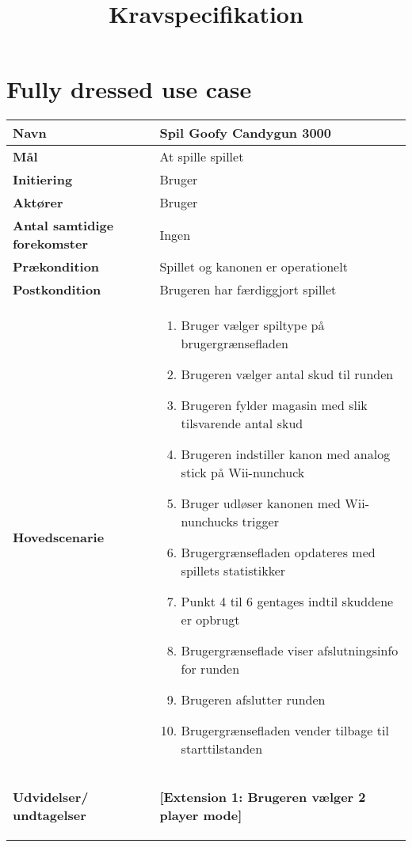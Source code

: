 \documentclass{article}
\begin{document}
	\title{Kravspecifikation}
	\maketitle
	
	\section{Fully dressed use case}
	\begin{tabular}{|>{\hspace{0pt}}p{3cm}  |>{\hspace{0pt}}p{9cm}|}
		\hline
		\textbf{Navn} & Spil Goofy Candygun 3000\\ \hline
		\textbf{Mål} & At spille spillet\\ \hline
		\textbf{Initiering} & Bruger\\ \hline
		\textbf{Aktører} & Bruger\\ \hline
		\textbf{Antal samtidige forekomster} & Ingen \\ \hline
		\textbf{Prækondition} & Spillet og kanonen er operationelt \\ \hline
		\textbf{Postkondition} &  Brugeren har færdiggjort spillet \\ \hline
		\textbf{Hovedscenarie} & \begin{enumerate}
			\item Bruger vælger spiltype på brugergrænsefladen
			\subitem [Extension 1: Brugeren vælger 2 player mode] 
			\item Brugeren vælger antal skud til runden
			\item Brugeren fylder magasin med slik tilsvarende antal skud
			\item Brugeren indstiller kanon med analog stick på Wii-nunchuck
			\item Bruger udløser kanonen med Wii-nunchucks trigger
			\item Brugergrænsefladen opdateres med spillets statistikker
			\item Punkt 4 til 6 gentages indtil skuddene er opbrugt 
			\subitem[Extension 2: Bruger afslutter det igangværende spil]
			\item Brugergrænseflade viser afslutningsinfo for runden
			\item Brugeren afslutter runden
			\item Brugergrænsefladen vender tilbage til starttilstanden
		\end{enumerate}\\ \hline
		\textbf{Udvidelser/ undtagelser} & \textbf{[Extension 1: Brugeren vælger 2 player mode]} \newline \begin{enumerate} 

\end{enumerate}
\end{tabular}
\end{document}
